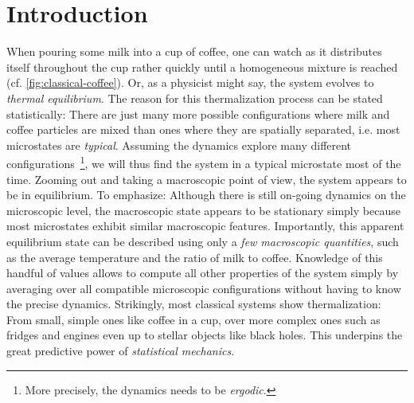 \chapter*{Introduction}
\label{pt:introduction}
When pouring some milk into a cup of coffee, one can watch as it distributes itself throughout the cup rather quickly until a homogeneous mixture is reached (cf. \autoref{fig:classical-coffee}). Or, as a physicist might say, the system evolves to \emph{thermal equilibrium}. The reason for this thermalization process can be stated statistically: There are just many more possible configurations where milk and coffee particles are mixed than ones where they are spatially separated, i.e. most microstates are \emph{typical}. Assuming the dynamics explore many different configurations~\footnote{More precisely, the dynamics needs to be \emph{ergodic}.},
we will thus find the system in a typical microstate most of the time. Zooming out and taking a macroscopic point of view, the system appears to be in equilibrium. To emphasize: Although there is still on-going dynamics on the microscopic level, the macroscopic state appears to be stationary simply because most microstates exhibit similar macroscopic features. Importantly, this apparent equilibrium state can be described using only a \emph{few macroscopic quantities}, such as the average temperature and the ratio of milk to coffee.
Knowledge of this handful of values allows to compute all other properties of the system simply by averaging over all compatible microscopic configurations without having to know the precise dynamics. Strikingly, most classical systems show thermalization: From small, simple ones like coffee in a cup, over more complex ones such as fridges and engines even up to stellar objects like black holes. This underpins the great predictive power of \emph{statistical mechanics}.
